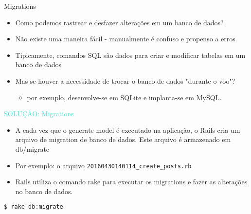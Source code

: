 \begin{frame}{Migrations}
	
		
	\begin{itemize}
		\item \alert{Como podemos rastrear e desfazer alterações em um banco de dados?}
		\item Não existe uma maneira fácil - manualmente é confuso e propenso a erros.
		\item Tipicamente, comandos SQL são dados para criar e modificar tabelas em um
		banco de dados
		\item Mas se houver a necessidade de trocar o banco de dados "durante o voo"?
		\begin{itemize}
		  \item por exemplo, desenvolve-se em SQLite e implanta-se em MySQL.
		\end{itemize}
	\end{itemize}
	
	\begin{center}
		\textcolor{Turquoise}{{\huge SOLUÇÃO: Migrations}}
	\end{center}
	
	\framebreak
	
	\begin{itemize}
		\item A cada vez que o \alert{generate model} é executado na aplicação, o Rails cria um
		arquivo de \alert{migration} de banco de dados. Este arquivo é armazenado em \alert{db/migrate}
		\item Por exemplo: o arquivo \verb|20160430140114_create_posts.rb|
	\end{itemize}
	  
	
	
	\begin{itemize}
		\item Rails utiliza o comando \alert{rake} para executar os \alert{migrations} e fazer as alterações
		no banco de dados.
	\end{itemize}
	
	\begin{lstlisting}[style=BashInputBasicStyle]
		$ rake db:migrate
	\end{lstlisting}
	
\end{frame}